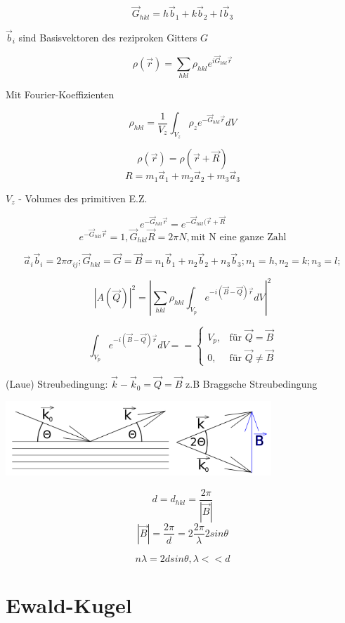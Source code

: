 \[ \vec G_{hkl} = h\vec b_1+ k\vec b_2+ l\vec b_3 \]

\(\vec b_i\) sind Basisvektoren des reziproken Gitters \(G\)

\[ \rho (\vec r) = \sum_{hkl} \rho_{hkl}e^{i\vec G_{hkl}\vec r} \]

Mit Fourier-Koeffizienten

\[ \rho_{hkl} = \frac 1 {V_z}\int_{V_z}\rho_z e^{-\vec G_{hkl}\vec
  r}dV \]

\[ \rho(\vec r) = \rho (\vec r+\vec R)\]
\[ R=m_1\vec a_1+m_2\vec a_2+m_3\vec a_3\]

\(V_z\) - Volumes des primitiven E.Z.

\[ e^{-\vec G_{hkl}\vec r}=  e^{-\vec G_{hkl}(\vec r+\vec R} \]
\[ e^{-\vec G_{hkl}\vec r}=1, \vec G_{hkl}\vec R= 2\pi N, \text{mit N
  eine ganze Zahl} \]

\[\vec a_i \vec b_i = 2\pi \sigma_{ij};  \vec G_{hkl} = \vec G = \vec
B = n_1 \vec b_1 +  n_2 \vec b_2 + n_3 \vec b_3; n_1=h, n_2=k; n_3=l; \]

\[  | A(\vec Q)|^2= |\sum_{hkl}\rho_{hkl}\int_{V_p} e^{-i(\vec B-\vec
  Q)\vec r} dV|^2 \]

\[ 
\int_{V_p} e^{-i(\vec B-\vec Q)\vec r} dV = =\begin{cases}
  V_p,  & \text{für } \vec Q=\vec B \\
  0, & \text{für } \vec Q\neq\vec B
\end{cases}
\]

(Laue) Streubedingung: \(\vec k - \vec k_0 = \vec Q= \vec B \)
z.B Braggsche Streubedingung

 
\includegraphics[width=0.75\textwidth]{kap03_03.png}

\[ d = d_{hkl} = \frac {2\pi}{|\vec B|}\]
\[|\vec B| =  \frac {2\pi}{d} =2
\frac {2\pi}{\lambda}2sin\theta \]

\[ n\lambda = 2dsin\theta, \lambda << d\]

\section{Ewald-Kugel}

